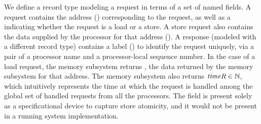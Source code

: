 
We define a record type modeling a request in terms of a set of named fields.
A request contains the address (\addrQ) corresponding to the request, as well as a
\desc{} indicating whether the request is a load or a store. A store request
also contains the data supplied by the processor for that address (\dataQ). A
response (modeled with a different record type) contains a label ()
to identify the request uniquely, via a pair of a processor name and a processor-local
sequence number.  In the case of a load request, the memory
subsystem returns \dataR, the data returned by the memory subsystem for that
address. The memory subsystem also returns $\textit{timeR} \in \mathbb{N}$, which
intuitively represents the time at which the request is handled among the
global set of handled requests from all the processors. The \timeR{} field is
present solely as a specificational device to capture store atomicity, and it
would not be present in a running system implementation.



